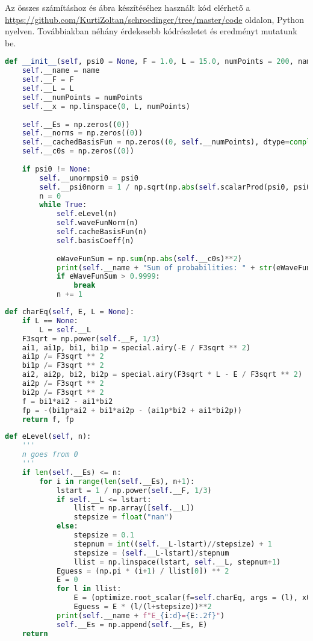 Az összes számításhoz és ábra készítéséhez használt kód elérhető a \url{https://github.com/KurtiZoltan/schroedinger/tree/master/code} oldalon, Python nyelven. Továbbiakban néhány érdekesebb kódrészletet és eredményt mutatunk be.

\begin{lstlisting}[language=Python]
def __init__(self, psi0 = None, F = 1.0, L = 15.0, numPoints = 200, name = "1D: "):
    self.__name = name
    self.__F = F
    self.__L = L
    self.__numPoints = numPoints
    self.__x = np.linspace(0, L, numPoints)
    
    self.__Es = np.zeros((0))
    self.__norms = np.zeros((0))
    self.__cachedBasisFun = np.zeros((0, self.__numPoints), dtype=complex)
    self.__c0s = np.zeros((0))
    
    if psi0 != None:
        self.__unormpsi0 = psi0
        self.__psi0norm = 1 / np.sqrt(np.abs(self.scalarProd(psi0, psi0)))
        n = 0
        while True:
            self.eLevel(n)
            self.waveFunNorm(n)
            self.cacheBasisFun(n)
            self.basisCoeff(n)
            
            eWaveFunSum = np.sum(np.abs(self.__c0s)**2)
            print(self.__name + "Sum of probabilities: " + str(eWaveFunSum))
            if eWaveFunSum > 0.9999:
                break
            n += 1
\end{lstlisting}

\begin{lstlisting}[language=Python]
def charEq(self, E, L = None):
    if L == None:
        L = self.__L
    F3sqrt = np.power(self.__F, 1/3)
    ai1, ai1p, bi1, bi1p = special.airy(-E / F3sqrt ** 2)
    ai1p /= F3sqrt ** 2
    bi1p /= F3sqrt ** 2
    ai2, ai2p, bi2, bi2p = special.airy(F3sqrt * L - E / F3sqrt ** 2)
    ai2p /= F3sqrt ** 2
    bi2p /= F3sqrt ** 2
    f = bi1*ai2 - ai1*bi2
    fp = -(bi1p*ai2 + bi1*ai2p - (ai1p*bi2 + ai1*bi2p))
    return f, fp
\end{lstlisting}

\begin{lstlisting}[language=Python]
def eLevel(self, n):
    '''
    n goes from 0
    '''
    if len(self.__Es) <= n:
        for i in range(len(self.__Es), n+1):
            lstart = 1 / np.power(self.__F, 1/3)
            if self.__L <= lstart:
                llist = np.array([self.__L])
                stepsize = float("nan")
            else:
                stepsize = 0.1
                stepnum = int((self.__L-lstart)//stepsize) + 1
                stepsize = (self.__L-lstart)/stepnum
                llist = np.linspace(lstart, self.__L, stepnum+1)
            Eguess = (np.pi * (i+1) / llist[0]) ** 2
            E = 0
            for l in llist:
                E = (optimize.root_scalar(f=self.charEq, args = (l), x0=Eguess, fprime=True)).root
                Eguess = E * (l/(l+stepsize))**2
            print(self.__name + f"E_{i:d}={E:.2f}")
            self.__Es = np.append(self.__Es, E)
    return
\end{lstlisting}

